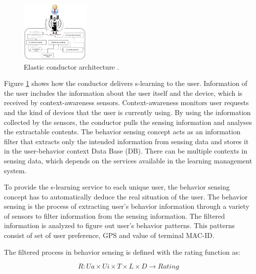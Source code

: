 \documentclass[journal]{vgtc}
\begin{document}
  \begin{figure}[t]
    \centering
    \includegraphics[width=0.3\textwidth]{elastic-conductor}
    \caption{Elastic conductor architecture \cite{Kim2013}.}
    \label{elastic-conductor}
  \end{figure}

  Figure \ref{elastic-conductor} shows how the conductor delivers s-learning to the user. Information of the user includes the information about the user itself and the device, which is received by context-awareness sensors. Context-awareness monitors user requests and the kind of devices that the user is currently using. By using the information collected by the sensors, the conductor pulls the sensing information and analyses the extractable contents. The behavior sensing concept acts as an information filter that extracts only the intended information from sensing data and stores it in the user-behavior context Data Base (DB). There can be multiple contexts in sensing data, which depends on the services available in the learning management system.

  To provide the s-learning service to each unique user, the behavior sensing concept has to automatically deduce the real situation of the user. The behavior sensing is the process of extracting user's behavior information through a variety of sensors to filter information from the sensing information. The filtered information is analyzed to figure out user's behavior patterns. This patterns consist of set of user preference, GPS and value of terminal MAC-ID.


  The filtered process in behavior sensing is defined with the rating function as:

  \begin{equation}
    R: Ua \times Ui \times T \times L \times D \rightarrow Rating
  \end{equation}
\end{document}
